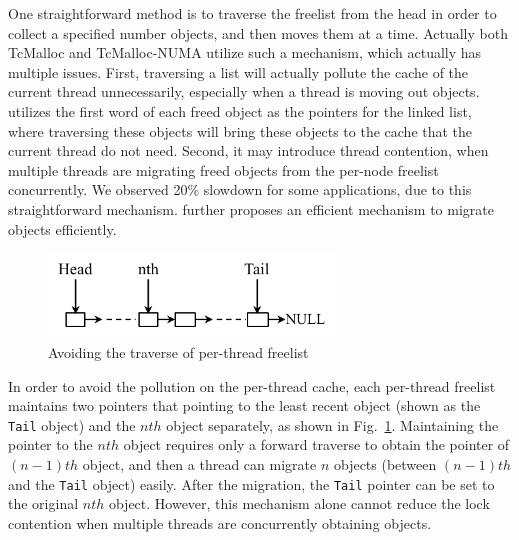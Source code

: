 One straightforward method is to traverse the  freelist from the head in order to collect a specified number objects, and then moves them at a time. Actually both TcMalloc and TcMalloc-NUMA utilize such a mechanism, which   actually has multiple issues. First, traversing a list will actually pollute the cache of the current thread unnecessarily, especially when a thread is moving out objects. \NM{} utilizes the first word of each freed object as the pointers for the linked list, where traversing these objects will bring these objects to the cache that the current thread do not need. Second, it may introduce thread contention, when multiple threads are migrating freed objects from the per-node freelist concurrently. We observed  20\% slowdown for some applications, due to this straightforward mechanism. \NM{} further proposes an efficient mechanism to migrate objects efficiently. 

\begin{figure}
\centering
\includegraphics[width=3in]{figure/perthreadlist}
\vspace{-0.1in}
\caption{Avoiding the traverse of per-thread freelist\label{fig:perthreadlist}}
\vspace{-0.1in}
\end{figure}
In order to avoid the pollution on the per-thread cache, each per-thread freelist maintains two pointers that pointing to the least recent object (shown as the \texttt{Tail} object) and the $nth$ object separately, as shown in Fig.~\ref{fig:perthreadlist}. Maintaining the pointer to the $nth$ object requires only a forward traverse to obtain the pointer of $(n-1)th$ object, and then a thread can migrate $n$ objects (between $(n-1)th$ and the \texttt{Tail} object) easily. 
After the migration,  the \texttt{Tail} pointer can be set to the original $nth$ object. However, this mechanism alone cannot reduce the lock contention when multiple threads are concurrently obtaining objects.

